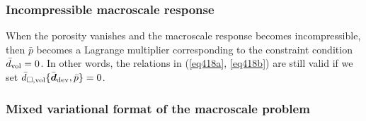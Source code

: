 \documentclass[10pt,a4paper]{article}
\begin{document}
\subsubsection{Incompressible macroscale response}

When the porosity vanishes and the macroscale response becomes incompressible, then $\bar{p}$ becomes a Lagrange multiplier corresponding to the constraint condition $\bar{d}_{\mathrm{vol}} = 0$. In other words, the relations in (\ref{eq418a}, \ref{eq418b}) are still valid if we set $\bar{d}_{\Box,\mathrm{vol}}\{\bar{\boldsymbol{d}}_{\mathrm{dev}},\bar p\} = 0$.

\subsubsection{Mixed variational format of the macroscale problem}
\end{document}

